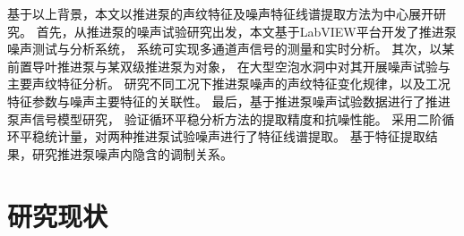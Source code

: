 \begin{comment}
传统的频谱分析方法已经无法准确的对流致激励特征声源进行识别，以及对推进泵的运行状态进行表征。
其声信号中存在复杂的干扰因素：其一，推进泵处在复杂的背景环境声场中，
动力系统等辅助结构产生的辐射噪声也给目标声源信号带来了很大干扰，影响
测试系统对推进泵目标真实辐射声信号的监测；其二，推进泵结构复杂，
推进泵辐射噪声场同时存在转子旋转声源，以及定子导管结构的静止声源，
其辐射噪声具有分量复杂性。基于上述因素，监测系统接收到的目标声场信号的信噪比较低。特征信
号如流致激励源特征频率、轴频等与其他背景噪声相比均较为微弱，
给基于传统噪声特征提取方法带来了困难，难以准确的识别声信号的流致激励源特征。
其次，推进泵噪声存在显著的调制特性，调制现象包含着丰富的流场信息，
但是传统的频谱分析及解调方法无法实现高精度低频调制特征的提取。
因此，开展低信噪比工况下的推进泵声信号的低频特征提取技术研究
有重要的理论和工程意义。
\end{comment}

基于以上背景，本文以推进泵的声纹特征及噪声特征线谱提取方法为中心展开研究。
首先，从推进泵的噪声试验研究出发，本文基于LabVIEW平台开发了推进泵噪声测试与分析系统，
系统可实现多通道声信号的测量和实时分析。 
其次，以某前置导叶推进泵与某双级推进泵为对象，
在大型空泡水洞中对其开展噪声试验与主要声纹特征分析。
研究不同工况下推进泵噪声的声纹特征变化规律，以及工况特征参数与噪声主要特征的关联性。
最后，基于推进泵噪声试验数据进行了推进泵声信号模型研究，
验证循环平稳分析方法的提取精度和抗噪性能。
采用二阶循环平稳统计量，对两种推进泵试验噪声进行了特征线谱提取。
基于特征提取结果，研究推进泵噪声内隐含的调制关系。

\begin{comment}

目前针对推进泵流致激励特性的研究已经开展了大量工作，研究主要集中通过数值模拟获取
压力脉动特性、激振力特性等方面，难以通过试验精确获取流致激励源特征。
其中蕴含着丰富的流致激励
源信息，但是传统的频谱分析及解调方法无法实现高精度低频调制特征的提取。

\end{comment}

\section{研究现状}

